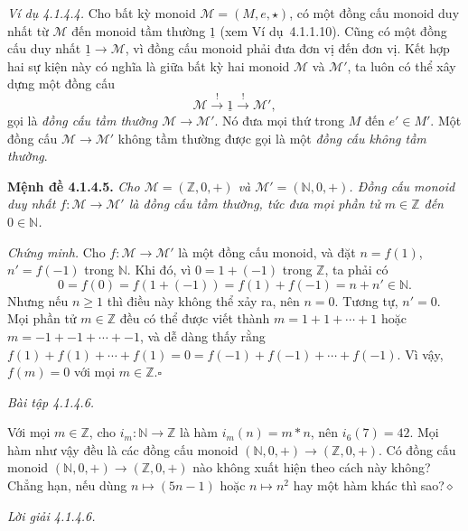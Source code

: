 \noindent\textit{Ví dụ 4.1.4.4.} Cho bất kỳ monoid $\mathcal{M}=(M,e,\star)$, có một đồng cấu monoid duy nhất từ $\mathcal{M}$ đến monoid tầm thường $\underline{1}$ (xem Ví dụ~4.1.1.10). Cũng có một đồng cấu duy nhất $\underline{1}\to\mathcal{M}$, vì đồng cấu monoid phải đưa đơn vị đến đơn vị. Kết hợp hai sự kiện này có nghĩa là giữa bất kỳ hai monoid $\mathcal{M}$ và $\mathcal{M}'$, ta luôn có thể xây dựng một đồng cấu
\[
\mathcal{M}\xrightarrow{!}\underline{1}\xrightarrow{!}\mathcal{M}',
\]
gọi là \emph{đồng cấu tầm thường $\mathcal{M}\to\mathcal{M}'$}. Nó đưa mọi thứ trong $M$ đến $e'\in M'$. Một đồng cấu $\mathcal{M}\to\mathcal{M}'$ không tầm thường được gọi là một \emph{đồng cấu không tầm thường}.

\noindent\textbf{Mệnh đề 4.1.4.5.} \emph{Cho $\mathcal{M}=(\mathbb{Z},0,+)$ và $\mathcal{M}'=(\mathbb{N},0,+)$. Đồng cấu monoid duy nhất $f:\mathcal{M}\to\mathcal{M}'$ là đồng cấu tầm thường, tức đưa mọi phần tử $m\in\mathbb{Z}$ đến $0\in\mathbb{N}$.}

\noindent\textit{Chứng minh.} Cho $f:\mathcal{M}\to\mathcal{M}'$ là một đồng cấu monoid, và đặt $n=f(1)$, $n'=f(-1)$ trong $\mathbb{N}$. Khi đó, vì $0=1+(-1)$ trong $\mathbb{Z}$, ta phải có
\[
0=f(0)=f(1+(-1))=f(1)+f(-1)=n+n'\in\mathbb{N}.
\]
Nhưng nếu $n\ge1$ thì điều này không thể xảy ra, nên $n=0$. Tương tự, $n'=0$. Mọi phần tử $m\in\mathbb{Z}$ đều có thể được viết thành $m=1+1+\cdots+1$ hoặc $m=-1+-1+\cdots+-1$,
và dễ dàng thấy rằng $f(1)+f(1)+\cdots+f(1)=0=f(-1)+f(-1)+\cdots+f(-1)$. Vì vậy, $f(m)=0$ với mọi $m\in\mathbb{Z}$.\hfill$\square$

\noindent\textit{Bài tập 4.1.4.6.}\keepwithnext

Với mọi $m\in\mathbb{Z}$, cho $i_m:\mathbb{N}\to\mathbb{Z}$ là hàm $i_m(n)=m*n$, nên $i_6(7)=42$. Mọi hàm như vậy đều là các đồng cấu monoid $(\mathbb{N},0,+)\to(\mathbb{Z},0,+)$. Có đồng cấu monoid $(\mathbb{N},0,+)\to(\mathbb{Z},0,+)$ nào không xuất hiện theo cách này không? Chẳng hạn, nếu dùng $n\mapsto(5n-1)$ hoặc $n\mapsto n^2$ hay một hàm khác thì sao?\hfill$\diamond$

\noindent\textit{Lời giải 4.1.4.6.}\keepwithnext

